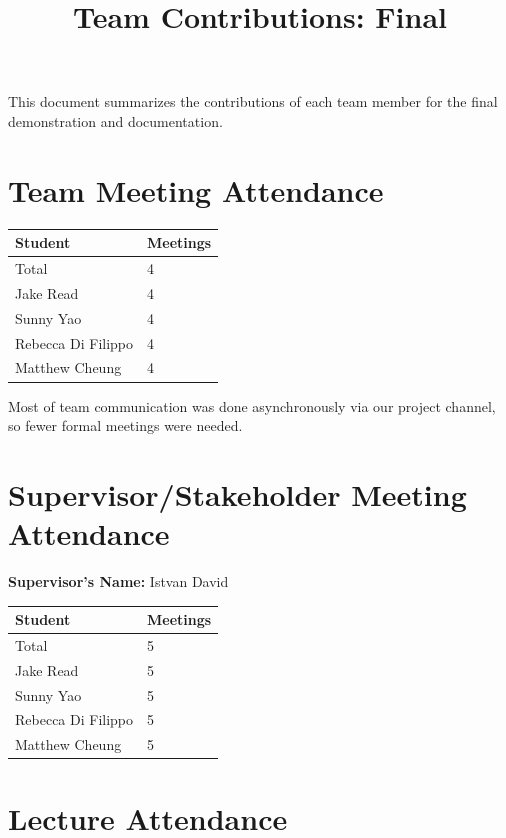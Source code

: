 \documentclass{article}
\title{Team Contributions: Final\\\progname}
\author{\authname}
\date{}
\begin{document}
\maketitle

This document summarizes the contributions of each team member for the final
demonstration and documentation.

\section{Team Meeting Attendance}


\begin{table}[H]
\centering
\begin{tabular}{ll}
\toprule
\textbf{Student} & \textbf{Meetings}\\
\midrule
Total & 4\\
Jake Read & 4\\ %
Sunny Yao & 4\\ %
Rebecca Di Filippo & 4\\ %
Matthew Cheung & 4\\ %
\bottomrule
\end{tabular}
\end{table}

Most of team communication was done asynchronously via our project channel, so fewer formal meetings were needed.

\section{Supervisor/Stakeholder Meeting Attendance}


\noindent \textbf{Supervisor's Name: } Istvan David %

\begin{table}[H]
\centering
\begin{tabular}{ll}
\toprule
\textbf{Student} & \textbf{Meetings}\\
\midrule
Total & 5\\
Jake Read & 5\\ %
Sunny Yao & 5\\ %
Rebecca Di Filippo & 5\\ %
Matthew Cheung & 5\\ %
\bottomrule
\end{tabular}
\end{table}


\section{Lecture Attendance}
\end{document}
